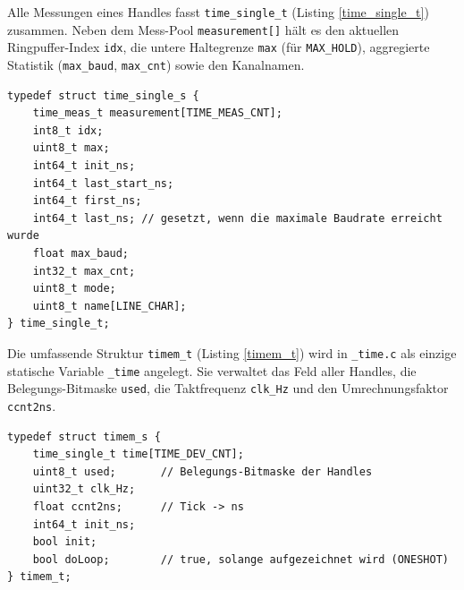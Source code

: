 Alle Messungen eines Handles fasst \verb|time_single_t|
(Listing \ref{time_single_t}) zusammen. Neben dem Mess-Pool
\verb|measurement[]| hält es den aktuellen Ringpuffer-Index \verb|idx|,
die untere Haltegrenze \verb|max| (für \verb|MAX_HOLD|), aggregierte
Statistik (\verb|max_baud|, \verb|max_cnt|) sowie den Kanalnamen.

\begin{listing}
\begin{verbatim}
typedef struct time_single_s {
    time_meas_t measurement[TIME_MEAS_CNT];
    int8_t idx;
    uint8_t max;
    int64_t init_ns;
    int64_t last_start_ns;
    int64_t first_ns;
    int64_t last_ns; // gesetzt, wenn die maximale Baudrate erreicht wurde
    float max_baud;
    int32_t max_cnt;
    uint8_t mode;
    uint8_t name[LINE_CHAR];
} time_single_t;
\end{verbatim}
\caption{Definition der \texttt{time\_single\_t} Struktur}
\label{time_single_t}
\end{listing}

Die umfassende Struktur \verb|timem_t| (Listing \ref{timem_t}) wird in
\verb|_time.c| als einzige statische Variable \verb|_time| angelegt. Sie
verwaltet das Feld aller Handles, die Belegungs-Bitmaske \verb|used|,
die Taktfrequenz \verb|clk_Hz| und den Umrechnungsfaktor \verb|ccnt2ns|.

\begin{listing}
\begin{verbatim}
typedef struct timem_s {
    time_single_t time[TIME_DEV_CNT];
    uint8_t used;       // Belegungs-Bitmaske der Handles
    uint32_t clk_Hz;
    float ccnt2ns;      // Tick -> ns
    int64_t init_ns;
    bool init;
    bool doLoop;        // true, solange aufgezeichnet wird (ONESHOT)
} timem_t;
\end{verbatim}
\caption{Definition der \texttt{timem\_t} Struktur}
\label{timem_t}
\end{listing}

